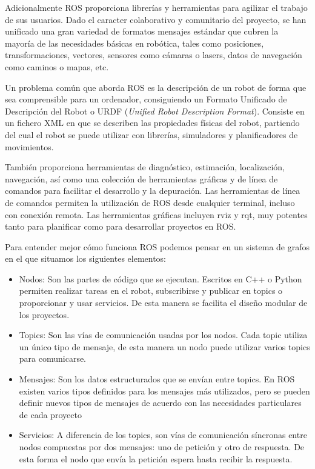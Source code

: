 Adicionalmente ROS proporciona librerías y herramientas para agilizar el trabajo de sus usuarios. Dado el caracter colaborativo y comunitario del proyecto, se han unificado una gran variedad de formatos mensajes estándar que cubren la mayoría de las necesidades básicas en robótica, tales como posiciones, transformaciones, vectores, sensores como cámaras o lasers, datos de navegación como caminos o mapas, etc. 

Un problema común que aborda ROS es la descripción de un robot de forma que sea comprensible para un ordenador, consiguiendo un Formato Unificado de Descripción del Robot o URDF (\textit{Unified Robot Description Format}). Consiste en un fichero XML en que se describen las propiedades físicas del robot, partiendo del cual el robot se puede utilizar con librerías, simuladores y planificadores de movimientos.

También proporciona herramientas de diagnóstico, estimación, localización, navegación, así como una colección de herramientas gráficas y de línea de comandos para facilitar el desarrollo y la depuración. Las herramientas de línea de comandos permiten la utilización de ROS desde cualquier terminal, incluso con conexión remota. Las herramientas gráficas incluyen rviz y rqt, muy potentes tanto para planificar como para desarrollar proyectos en ROS.

Para entender mejor cómo funciona ROS podemos pensar en un sistema de grafos en el que situamos los siguientes elementos:

\begin{itemize}
	\item Nodos: Son las partes de código que se ejecutan. Escritos en C++ o Python permiten realizar tareas en el robot, subscribirse y publicar en topics o proporcionar y usar servicios. De esta manera se facilita el diseño modular de los proyectos.

	\item Topics: Son las vías de comunicación usadas por los nodos. Cada topic utiliza un único tipo de mensaje, de esta manera un nodo puede utilizar varios topics para comunicarse.

	\item Mensajes: Son los datos estructurados que se envían entre topics. En ROS existen varios tipos definidos para los mensajes más utilizados, pero se pueden definir nuevos tipos de mensajes de acuerdo con las necesidades particulares de cada proyecto

	\item Servicios: A diferencia de los topics, son vías de comunicación síncronas entre nodos compuestas por dos mensajes: uno de petición y otro de respuesta. De esta forma  el nodo que envía la petición espera hasta recibir la respuesta.
\end{itemize}


